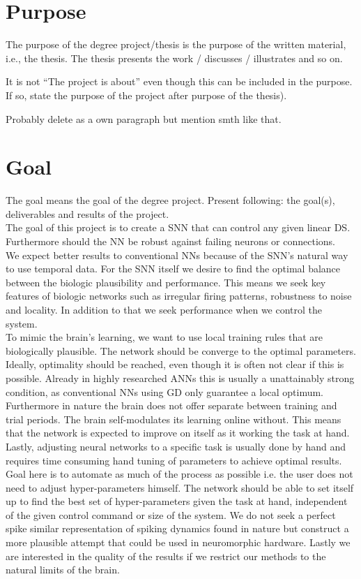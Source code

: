 \section{Purpose}
The purpose of the degree project/thesis is the purpose of the written material, i.e., the thesis. The thesis presents the work / discusses / illustrates and so on.

It is not “The project is about” even though this can be included in the purpose. If so, state the purpose of the project after purpose of the thesis).

Probably delete as a own paragraph but mention smth like that.



\section{Goal}
The goal means the goal of the degree project. Present following: the goal(s), deliverables and results of the project.\\

The goal of this project is to create a \ac{SNN} that can control any given linear \ac{DS}. Furthermore should the \ac{NN} be robust against failing neurons or connections.\\
We expect better results to conventional \acp{NN} because of the \ac{SNN}'s natural way to use temporal data. For the \ac{SNN} itself we desire to find the optimal balance between the biologic plausibility and performance. This means we seek key features of biologic networks such as irregular firing patterns, robustness to noise and locality. In addition to that we seek performance when we control the system.\\

To mimic the brain's learning, we want to use local training rules that are biologically plausible. The network should be converge to the optimal parameters.\\
Ideally, optimality should be reached, even though it is often not clear if this is possible. Already in highly researched \acp{ANN} this is usually a unattainably strong condition, as conventional \acp{NN} using \ac{GD} only guarantee a local optimum. \\
Furthermore in nature the brain does not offer separate between training and trial periods. The brain self-modulates its learning online without. This means that the network is expected to improve on itself as it working the task at hand.
Lastly, adjusting neural networks to a specific task is usually done by hand and requires time consuming hand tuning of parameters to achieve optimal results. Goal here is to automate as much of the process as possible i.e. the user does not need to adjust hyper-parameters himself. The network should be able to set itself up to find the best set of hyper-parameters given the task at hand, independent of the given control command or size of the system.
We do not seek a perfect spike similar representation of spiking dynamics found in nature but construct a more plausible attempt that could be used in neuromorphic hardware.
Lastly we are interested in the quality of the results if we restrict our methods to the natural limits of the brain.\\

